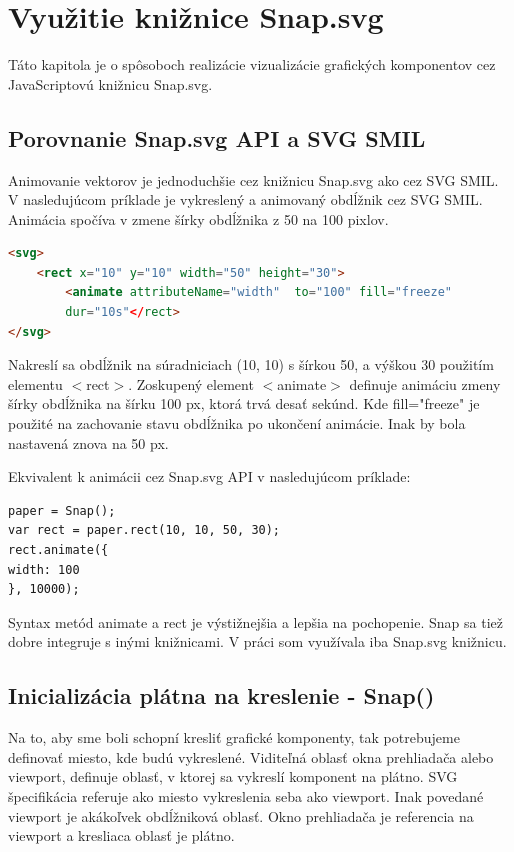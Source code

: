 \chapter{Využitie knižnice Snap.svg}
Táto kapitola je o spôsoboch realizácie vizualizácie grafických komponentov cez JavaScriptovú knižnicu Snap.svg. 

\section{Porovnanie Snap.svg API a SVG SMIL}
Animovanie vektorov je jednoduchšie cez knižnicu Snap.svg ako cez SVG SMIL.  V nasledujúcom príklade je vykreslený a animovaný obdĺžnik cez SVG SMIL. Animácia spočíva v zmene šírky obdĺžnika z 50 na 100 pixlov.
\begin{lstlisting}[language = html]
<svg>
	<rect x="10" y="10" width="50" height="30">
		<animate attributeName="width"  to="100" fill="freeze"  
		dur="10s"</rect>
</svg>
\end{lstlisting}

Nakreslí sa obdĺžnik na súradniciach (10, 10) s šírkou 50, a výškou 30 použitím elementu $<$rect$>$. Zoskupený element $<$animate$>$ definuje animáciu zmeny šírky obdĺžnika na šírku 100 px, ktorá trvá desať sekúnd. Kde fill="freeze" je použité na zachovanie stavu obdĺžnika po ukončení animácie. Inak by bola nastavená znova na 50 px. \cite[p.~9]{Dawber}

Ekvivalent k animácii cez Snap.svg API v nasledujúcom príklade:

\begin{lstlisting}
paper = Snap();
var rect = paper.rect(10, 10, 50, 30);
rect.animate({
width: 100
}, 10000);
\end{lstlisting}

Syntax metód animate a rect je výstižnejšia a lepšia na pochopenie. Snap sa tiež dobre integruje s inými knižnicami. V práci som využívala iba Snap.svg knižnicu.  


\section{Inicializácia plátna na kreslenie - Snap()}
Na to, aby sme boli schopní kresliť grafické komponenty, tak potrebujeme definovať miesto, kde budú vykreslené. Viditeľná oblasť okna prehliadača alebo viewport, definuje oblasť, v ktorej sa vykreslí komponent na plátno. SVG špecifikácia referuje ako miesto vykreslenia seba ako viewport. 
Inak povedané viewport je akákoľvek obdĺžniková oblasť. Okno prehliadača je referencia na viewport a kresliaca oblasť je plátno.   \cite{Dawber}


